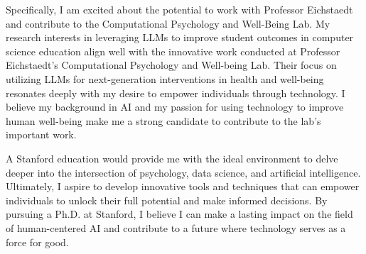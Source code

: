 \documentclass[12pt]{article}
\begin{document}
Specifically, I am excited about the potential to work with Professor Eichstaedt and contribute to the Computational Psychology and
Well-Being Lab.  My research interests in leveraging LLMs to improve student outcomes in computer science education
align well with the innovative work conducted at Professor Eichstaedt's Computational Psychology and Well-being Lab. Their focus on
utilizing LLMs for next-generation interventions in health and well-being resonates deeply with my desire to empower individuals through
technology. I believe my background in AI and my passion for using technology to improve human well-being make me a strong candidate to
contribute to the lab's important work.

A Stanford education would provide me with the ideal environment to delve deeper into the intersection of psychology, data science, and
artificial intelligence. Ultimately, I aspire to develop innovative tools and techniques that can empower individuals to unlock their full
potential and make informed decisions. By pursuing a Ph.D. at Stanford, I believe I can make a lasting impact on the field of human-centered
AI and contribute to a future where technology serves as a force for good.
\end{document}
